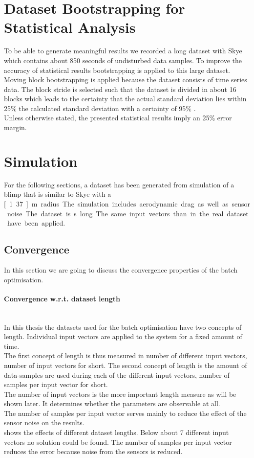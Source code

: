 \section{Dataset Bootstrapping for Statistical Analysis}
\label{sec:bootstrapping_and_statistics}
To be able to generate meaningful results we recorded a long dataset with Skye which contains about 850 seconds of undisturbed data samples.
To improve the accuracy of statistical results bootstrapping is applied to this large dataset.
Moving block bootstrapping is applied because the dataset consists of time series data.
The block stride is selected such that the dataset is divided in about 16 blocks which
leads to the certainty that the actual standard deviation lies within 25\% the calculated standard deviation with a certainty of 95\% \citep{WikiMaringOfError}. \\
Unless otherwise stated, the presented statistical results imply an 25\% error margin.

\section{Simulation}
For the following sections, a dataset has been generated from simulation of a blimp that is similar to Skye with a \unit[1.37]{m} radius.
The simulation includes aerodynamic drag as well as sensor noise.
The dataset is \unit[850]{s} long.
The same input vectors than in the real dataset have been applied.

\subsection{Convergence}
\label{sec:sim_convergence}
In this section we are going to discuss the convergence properties of the batch optimisation.

\paragraph{Convergence w.r.t. dataset length} ~\\
In this thesis the datasets used for the batch optimisation have two concepts of length.
Individual input vectors are applied to the system for a fixed amount of time. \\
The first concept of length is thus measured in number of different input vectors, number of input vectors for short.
The second concept of length is the amount of data-samples are used during each of the different input vectors, number of samples per input vector for short. \\
The number of input vectors is the more important length measure as will be shown later.
It determines whether the parameters are observable at all. \\
The number of samples per input vector serves mainly to reduce the effect of the sensor noise on the results. \\
 shows the effects of different dataset lengths.
Below about 7 different input vectors no solution could be found. 
The number of samples per input vector reduces the error because noise from the sensors is reduced.

